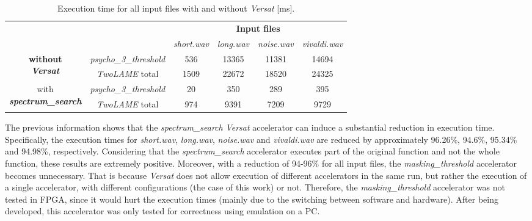\begin{table}[H]
    \centering
    \begin{tabular}{|c|c|c|c|c|c|}
    \cline{3-6}
    \multicolumn{2}{c|}{}  & \multicolumn{4}{c|}{\textbf{Input files}} \\
    \cline{3-6}
    \multicolumn{2}{c|}{} & \textit{short.wav} & \textit{long.wav} & \textit{noise.wav} & \textit{vivaldi.wav} \\
    \hline
   \multirow{2}{*}{\parbox{2.5cm}{\centering \textbf{without} \\ \textbf{\textit{Versat}}}}  & \multicolumn{1}{c|}{\textit{psycho\_3\_threshold}}  & 536 & 13365 & 11381 & 14694 \\ 
    \cline{2-6}
    & \multicolumn{1}{|c|}{\textit{TwoLAME} total}  & 1509 & 22672 & 18520 & 24325\\ 
    \hline
    \multirow{2}{*}{\parbox{3.2cm}{\centering with \\ \textbf{\textit{spectrum\_search}}}}  & \multicolumn{1}{c|}{\textit{psycho\_3\_threshold}}  & 20 & 350 & 289 & 395 \\ 
    \cline{2-6}
    & \multicolumn{1}{|c|}{\textit{TwoLAME} total}  & 974 & 9391 & 7209 & 9729 \\ 
    \hline
    \end{tabular}
    \caption{Execution time for all input files with and without \textit{Versat} [ms].}
    \label{time}
\end{table}

The previous information shows that the \textit{spectrum\_search} \textit{Versat} accelerator can induce a substantial reduction in execution time. Specifically, the execution times for \textit{short.wav}, \textit{long.wav}, \textit{noise.wav} and \textit{vivaldi.wav} are reduced by approximately 96.26\%, 94.6\%, 95.34\% and 94.98\%, respectively.
Considering that the \textit{spectrum\_search} accelerator executes part of the original function and not the whole function, these results are extremely positive. Moreover, with a reduction of 94-96\% for all input files, the \textit{masking\_threshold} accelerator becomes unnecessary. That is because \textit{Versat} does not allow execution of different accelerators in the same run, but rather the execution of a single accelerator, with different configurations (the case of this work) or not.
Therefore, the \textit{masking\_threshold} accelerator was not tested in FPGA, since it would hurt the execution times (mainly due to the switching between software and hardware). After being developed, this accelerator was only tested for correctness using emulation on a PC.


